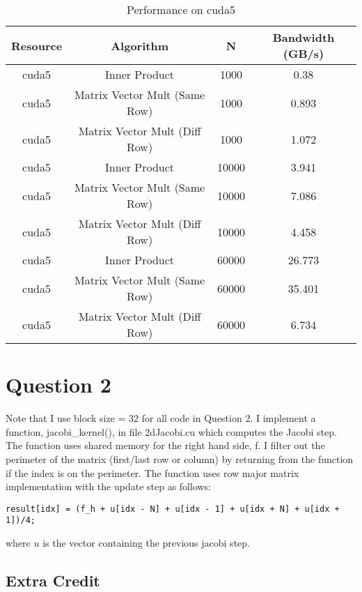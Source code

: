 \documentclass[12pt]{article}
\begin{document}
\begin{table}[h!]
\centering
\begin{tabular}{ |c|c|c|c| }
\hline
 Resource & Algorithm & N & Bandwidth (GB/s) \\ 
 \hline
cuda5 & Inner Product & 1000 & 0.38\\
\hline
cuda5 & Matrix Vector Mult (Same Row) & 1000 & 0.893\\
\hline
cuda5 & Matrix Vector Mult (Diff Row) & 1000 & 1.072\\
\hline
cuda5 & Inner Product & 10000 &  3.941\\
\hline
cuda5 & Matrix Vector Mult (Same Row) & 10000 & 7.086\\
\hline
cuda5 & Matrix Vector Mult (Diff Row) & 10000 & 4.458\\
\hline
cuda5 & Inner Product & 60000 &  26.773\\
\hline
cuda5 & Matrix Vector Mult (Same Row) & 60000 & 35.401\\
\hline
cuda5 & Matrix Vector Mult (Diff Row) & 60000 & 6.734\\
\hline
\end{tabular}
 \caption{Performance on cuda5}
 \label{cuda5}
 \end{table}

\newpage

\section{Question 2}

Note that I use block size = 32 for all code in Question 2. I implement a function, jacobi\_kernel(), in file 2dJacobi.cu which computes the Jacobi step. The function uses shared memory for the right hand side, f. I filter out the perimeter of the matrix (first/last row or column) by returning from the function if the index is on the perimeter. The function uses row major matrix implementation with the update step as follows:

\begin{verbatim}
result[idx] = (f_h + u[idx - N] + u[idx - 1] + u[idx + N] + u[idx + 1])/4;
\end{verbatim}

where $u$ is the vector containing the previous jacobi step.

\subsection{Extra Credit}
\end{document}
